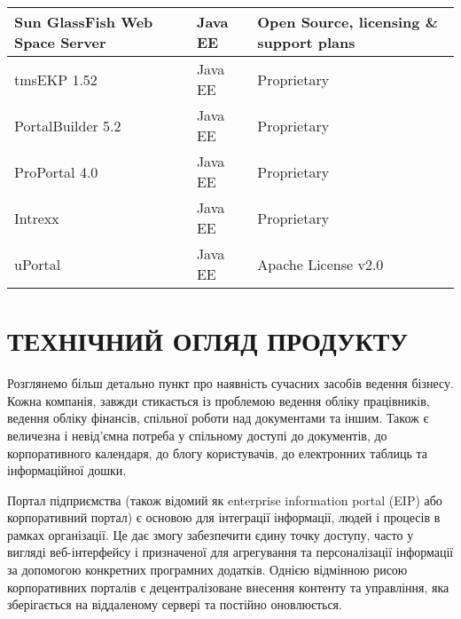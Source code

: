 \begin{center}
\begin{longtable}{|
p{}|
p{}|
p{}|}
 Sun GlassFish Web Space Server  & Java EE & Open Source, licensing \& support plans \\ \hline
 tmsEKP 1.52 & Java EE & Proprietary \\ \hline
 PortalBuilder 5.2 & Java EE & Proprietary \\ \hline
 ProPortal 4.0 & Java EE & Proprietary \\ \hline
 Intrexx & Java EE & Proprietary \\ \hline
 uPortal & Java EE & Apache License v2.0 \\ \hline

\end{longtable}
\end{center}

\section{ТЕХНІЧНИЙ ОГЛЯД ПРОДУКТУ}
Розглянемо більш детально пункт про наявність сучасних засобів ведення бізнесу. 
Кожна компанія, завжди стикається із проблемою ведення обліку працівників, ведення обліку фінансів, спільної роботи над документами та іншим.
Також є величезна і невід'ємна потреба у спільному доступі до документів, до корпоративного календаря, до блогу користувачів, до електронних таблиць та інформаційної дошки.
\par Портал підприємства (також відомий як enterprise information portal (EIP) або корпоративний портал) є основою для інтеграції інформації, людей і процесів в рамках організації. 
Це дає змогу забезпечити єдину точку доступу, часто у вигляді веб-інтерфейсу і призначеної для агрегування та персоналізації інформації за допомогою конкретних програмних додатків. Однією відмінною рисою корпоративних порталів є децентралізоване внесення контенту та управління, яка зберігається на віддаленому сервері та постійно оновлюється.
